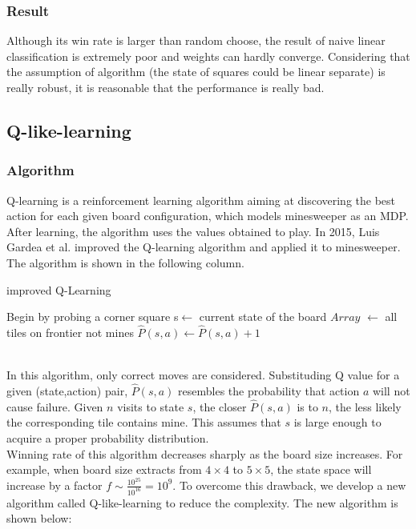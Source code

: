 \documentclass{article}
\begin{document}
\subsubsection{Result}
Although its win rate is larger than random choose, the result of naive linear classification is extremely poor and weights can hardly converge. Considering that the assumption of algorithm (the state of squares could be linear separate) is really robust, it is reasonable that the performance is really bad.


\subsection{Q-like-learning}
\subsubsection{Algorithm}
Q-learning is a reinforcement learning algorithm aiming at discovering the best action for each given board configuration, which models minesweeper as an MDP. After learning, the algorithm uses the values obtained to play. 
In 2015, Luis Gardea et al. improved the Q-learning algorithm and applied it to minesweeper. The algorithm is shown in the following column.
\begin{algorithm}[htb] 
	\caption{ improved Q-Learning} 
	\label{alg:Framwork} 
	\begin{algorithmic}[1]  
		\State Begin by probing a corner square
		\label{code:fram:extract} 
		\label{code:fram:trainbase} 
		\State s$\leftarrow$ current state of the board 
		\State $Array$ $\leftarrow$ all tiles on frontier not mines 
		\label{code:fram:classify} 
		\State$\hat{P}(s,a)\leftarrow\hat{P}(s,a)+1$
		\EndFor
		\EndWhile	
	\end{algorithmic} 
\end{algorithm}
\\In this algorithm, only correct moves are considered. Substituding Q value for a given (state,action) pair, $\hat{P}(s,a)$ resembles the probability that action $a$ will not cause failure. Given $n$ visits to state $s$, the closer $\hat{P}(s,a)$ is to $n$, the less likely the corresponding tile contains mine. This assumes that $s$ is large enough to acquire a proper probability distribution.\\
Winning rate of this algorithm decreases sharply as the board size increases. For example, when board size extracts from $4\times 4$ to $5\times5$, the state space will increase by a factor $f\sim \frac{10^{25}}{10^{16}}=10^9$. To overcome this drawback, we develop a new algorithm called Q-like-learning to reduce the complexity. The new algorithm is shown below:
\end{document}
